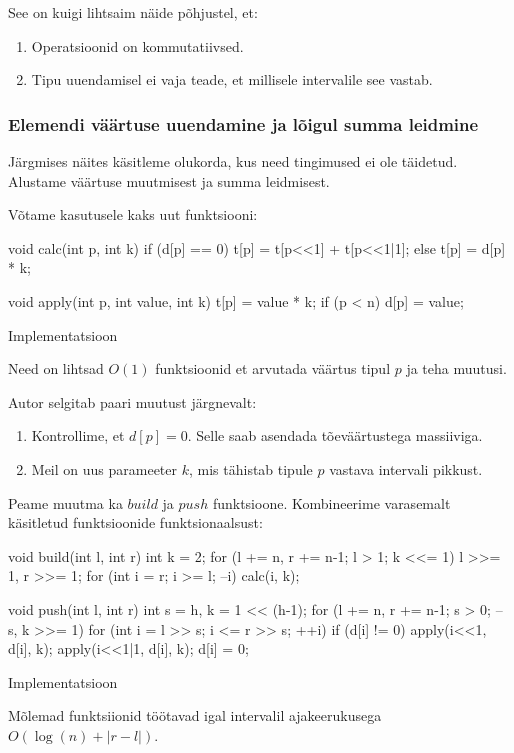 \documentclass{trkut}
\begin{document}
See on kuigi lihtsaim näide põhjustel, et:
\begin{enumerate}
   \item Operatsioonid on kommutatiivsed.
   \item Tipu uuendamisel ei vaja teade, et millisele intervalile see vastab.
\end{enumerate}

\subsubsection{Elemendi väärtuse uuendamine ja lõigul summa leidmine}
Järgmises näites käsitleme olukorda, kus need tingimused ei ole täidetud.
Alustame väärtuse muutmisest ja summa leidmisest.

Võtame kasutusele kaks uut funktsiooni:
\begin{cclol}
void calc(int p, int k) {
  if (d[p] == 0) t[p] = t[p<<1] + t[p<<1|1];
  else t[p] = d[p] * k;
}

void apply(int p, int value, int k) {
  t[p] = value * k;
  if (p < n) d[p] = value;
}
\end{cclol}
\begin{kk}[H]%
    \caption{Implementatsioon}%
    \label{CPH}%
    \end{kk}
Need on lihtsad $O(1)$ funktsioonid et arvutada väärtus tipul $p$ ja teha muutusi. 

Autor selgitab paari muutust järgnevalt:
\begin{enumerate}
   \item Kontrollime, et $d[p] = 0$. Selle saab asendada tõeväärtustega massiiviga.

   \item Meil on uus parameeter $k$, mis tähistab tipule $p$ vastava intervali pikkust.
\end{enumerate}

Peame muutma ka $build$ ja $push$ funktsioone. Kombineerime varasemalt käsitletud funktsioonide funktsionaalsust:
\begin{cclol}
void build(int l, int r) {
  int k = 2;
  for (l += n, r += n-1; l > 1; k <<= 1) {
    l >>= 1, r >>= 1;
    for (int i = r; i >= l; --i) calc(i, k);
  }
}

void push(int l, int r) {
  int s = h, k = 1 << (h-1);
  for (l += n, r += n-1; s > 0; --s, k >>= 1)
    for (int i = l >> s; i <= r >> s; ++i) if (d[i] != 0) {
      apply(i<<1, d[i], k);
      apply(i<<1|1, d[i], k);
      d[i] = 0;
    }
}
\end{cclol}
\begin{kk}[H]%
    \caption{Implementatsioon}%
    \label{CPH}%
    \end{kk}
Mõlemad funktsiionid töötavad igal intervalil ajakeerukusega $O(\log(n) + |r - l|)$. 
\end{document}
